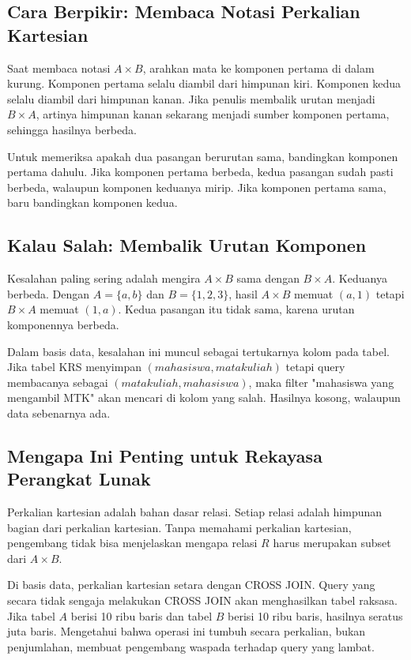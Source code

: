 \documentclass[11pt,a4paper]{article}
\begin{document}
\subsection{Cara Berpikir: Membaca Notasi Perkalian Kartesian}

Saat membaca notasi $A \times B$, arahkan mata ke komponen pertama di dalam kurung. Komponen pertama selalu diambil dari himpunan kiri. Komponen kedua selalu diambil dari himpunan kanan. Jika penulis membalik urutan menjadi $B \times A$, artinya himpunan kanan sekarang menjadi sumber komponen pertama, sehingga hasilnya berbeda.

Untuk memeriksa apakah dua pasangan berurutan sama, bandingkan komponen pertama dahulu. Jika komponen pertama berbeda, kedua pasangan sudah pasti berbeda, walaupun komponen keduanya mirip. Jika komponen pertama sama, baru bandingkan komponen kedua.

\subsection{Kalau Salah: Membalik Urutan Komponen}

Kesalahan paling sering adalah mengira $A \times B$ sama dengan $B \times A$. Keduanya berbeda. Dengan $A=\{a,b\}$ dan $B=\{1,2,3\}$, hasil $A \times B$ memuat $(a,1)$ tetapi $B \times A$ memuat $(1,a)$. Kedua pasangan itu tidak sama, karena urutan komponennya berbeda.

Dalam basis data, kesalahan ini muncul sebagai tertukarnya kolom pada tabel. Jika tabel KRS menyimpan $(mahasiswa, matakuliah)$ tetapi query membacanya sebagai $(matakuliah, mahasiswa)$, maka filter "mahasiswa yang mengambil MTK" akan mencari di kolom yang salah. Hasilnya kosong, walaupun data sebenarnya ada.

\subsection{Mengapa Ini Penting untuk Rekayasa Perangkat Lunak}

Perkalian kartesian adalah bahan dasar relasi. Setiap relasi adalah himpunan bagian dari perkalian kartesian. Tanpa memahami perkalian kartesian, pengembang tidak bisa menjelaskan mengapa relasi $R$ harus merupakan subset dari $A \times B$.

Di basis data, perkalian kartesian setara dengan CROSS JOIN. Query yang secara tidak sengaja melakukan CROSS JOIN akan menghasilkan tabel raksasa. Jika tabel $A$ berisi 10 ribu baris dan tabel $B$ berisi 10 ribu baris, hasilnya seratus juta baris. Mengetahui bahwa operasi ini tumbuh secara perkalian, bukan penjumlahan, membuat pengembang waspada terhadap query yang lambat.
\end{document}
